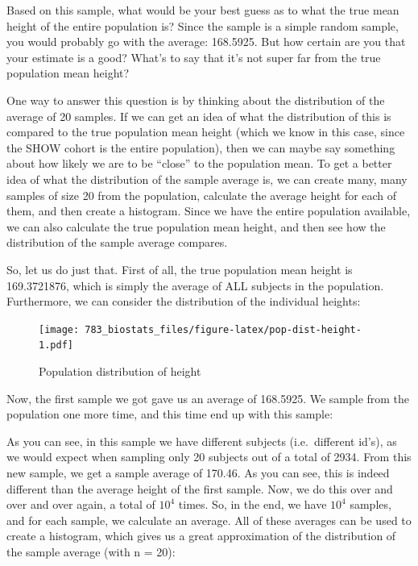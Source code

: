 \documentclass[]{book}
\theoremstyle{definition}
\theoremstyle{definition}
\theoremstyle{definition}
\theoremstyle{remark}
\begin{document}
Based on this sample, what would be your best guess as to what the true mean height of the entire population is? Since the sample is a simple random sample, you would probably go with the average: 168.5925. But how certain are you that your estimate is a good? What's to say that it's not super far from the true population mean height?

One way to answer this question is by thinking about the distribution of the average of 20 samples. If we can get an idea of what the distribution of this is compared to the true population mean height (which we know in this case, since the SHOW cohort is the entire population), then we can maybe say something about how likely we are to be ``close'' to the population mean. To get a better idea of what the distribution of the sample average is, we can create many, many samples of size 20 from the population, calculate the average height for each of them, and then create a histogram. Since we have the entire population available, we can also calculate the true population mean height, and then see how the distribution of the sample average compares.

So, let us do just that. First of all, the true population mean height is 169.3721876, which is simply the average of ALL subjects in the population. Furthermore, we can consider the distribution of the individual heights:

\begin{figure}
\centering
\texttt{[image: 783\_biostats\_files/figure-latex/pop-dist-height-1.pdf]}
\caption{\label{fig:pop-dist-height}Population distribution of height}
\end{figure}

Now, the first sample we got gave us an average of 168.5925. We sample from the population one more time, and this time end up with this sample:

\hypertarget{htmlwidget-08479c68cbb6859f9bdd}{}

As you can see, in this sample we have different subjects (i.e.~different id's), as we would expect when sampling only 20 subjects out of a total of 2934. From this new sample, we get a sample average of 170.46. As you can see, this is indeed different than the average height of the first sample. Now, we do this over and over and over again, a total of \ensuremath{10^{4}} times. So, in the end, we have \ensuremath{10^{4}} samples, and for each sample, we calculate an average. All of these averages can be used to create a histogram, which gives us a great approximation of the distribution of the sample average (with n = 20):
\end{document}

